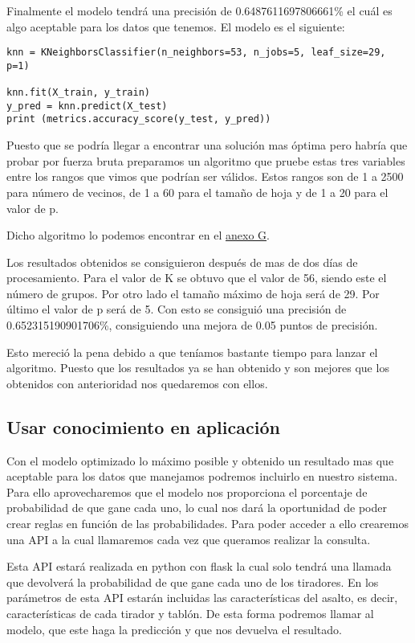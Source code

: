 Finalmente el modelo tendrá una precisión de 0.6487611697806661\% el cuál es algo
aceptable para los datos que tenemos. El modelo es el siguiente:

\begin{lstlisting}
knn = KNeighborsClassifier(n_neighbors=53, n_jobs=5, leaf_size=29, p=1)

knn.fit(X_train, y_train)
y_pred = knn.predict(X_test)
print (metrics.accuracy_score(y_test, y_pred))
\end{lstlisting}

Puesto que se podría llegar a encontrar una solución mas óptima pero habría que probar
por fuerza bruta preparamos un algoritmo que pruebe estas tres variables entre los rangos
que vimos que podrían ser válidos. Estos rangos son de 1 a 2500 para número de vecinos,
de 1 a 60 para el tamaño de hoja y de 1 a 20 para el valor de p.

Dicho algoritmo lo podemos encontrar en el \hyperref[cap:Algoritmo KNN]{anexo G}.

Los resultados obtenidos se consiguieron después de mas de dos días de procesamiento.
Para el valor de K se obtuvo que el valor de 56, siendo este el número de grupos. Por otro lado
el tamaño máximo de hoja será de 29. Por último el valor de p será de 5. Con esto se consiguió
una precisión de 0.652315190901706\%, consiguiendo una mejora de 0.05 puntos de precisión.

Esto mereció la pena debido a que teníamos bastante tiempo para lanzar el algoritmo. Puesto que
los resultados ya se han obtenido y son mejores que los obtenidos con anterioridad nos
quedaremos con ellos.

\subsection{Usar conocimiento en aplicación}

Con el modelo optimizado lo máximo posible y obtenido un resultado mas que aceptable
para los datos que manejamos podremos incluirlo en nuestro sistema. Para ello aprovecharemos
que el modelo nos proporciona el porcentaje de probabilidad de que gane cada uno, lo cual nos
dará la oportunidad de poder crear reglas en función de las probabilidades. Para poder acceder
a ello crearemos una API a la cual llamaremos cada vez que queramos realizar la consulta.

Esta API estará realizada en python con flask la cual solo tendrá una llamada que devolverá
la probabilidad de que gane cada uno de los tiradores. En los parámetros de esta API estarán
incluidas las características del asalto, es decir, características de cada tirador y tablón.
De esta forma podremos llamar al modelo, que este haga la predicción y que nos
devuelva el resultado.

